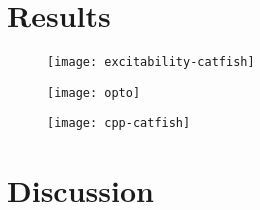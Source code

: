 \section{Results}
\begin{figure}[h]
    \texttt{[image: excitability-catfish]}
\end{figure}
\begin{figure}[h]
    \texttt{[image: opto]}
\end{figure}
\begin{figure}[h]
    \texttt{[image: cpp-catfish]}
\end{figure}

\section{Discussion}
